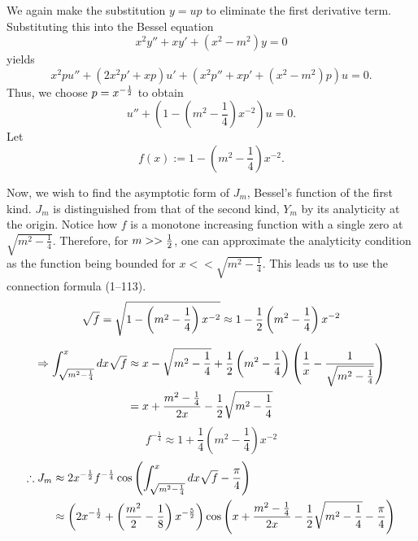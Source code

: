 \item
We again make the substitution $y = up$ to eliminate the first derivative term.
Substituting this into the Bessel equation
\[
	x^2 y'' + xy' + \left( x^2 - m^2 \right) y = 0
\]
yields
\[
	x^2 pu'' + \left( 2x^2 p' + xp \right)u' + \left( x^2 p'' + xp' + \left( x^2 - m^2 \right)p \right)u = 0.
\]	
Thus, we choose $p = x^{-\frac{1}{2}}$ to obtain
\[
	u'' + \left( 1 - \left( m^2 - \frac{1}{4} \right) x^{-2} \right) u = 0.
\]
Let
\[
	f(x) := 1 - \left( m^2 - \frac{1}{4} \right) x^{-2}.
\]

Now, we wish to find the asymptotic form of $J_m$, Bessel's function of the first kind.
$J_m$ is distinguished from that of the second kind, $Y_m$ by its analyticity at the origin.
Notice how $f$ is a monotone increasing function with a single zero at $\sqrt{m^2 - \frac{1}{4}}$.
Therefore, for $m >> \frac{1}{2}$, one can approximate the analyticity condition as the function being bounded for $x << \sqrt{m^2 - \frac{1}{4}}$.
This leads us to use the connection formula  (1--113).
\[
	\sqrt{f}
	= \sqrt{1 - \left( m^2 - \frac{1}{4} \right) x^{-2}}
	\approx 1 - \frac{1}{2} \left( m^2 - \frac{1}{4} \right) x^{-2}
\]
\begin{align*}
	\Rightarrow \int_{\sqrt{m^2 - \frac{1}{4}}}^{x} dx \sqrt{f}
	&\approx x - \sqrt{m^2 - \frac{1}{4}} + \frac{1}{2} \left( m^2 - \frac{1}{4} \right) \left( \frac{1}{x} - \frac{1}{\sqrt{m^2 - \frac{1}{4}}} \right) \\
	&= x + \frac{m^2 - \frac{1}{4}}{2x} - \frac{1}{2}\sqrt{m^2 - \frac{1}{4}}
\end{align*}
\[
	f^{-\frac{1}{4}} \approx 1 + \frac{1}{4} \left( m^2 - \frac{1}{4} \right) x^{-2}
\]
\begin{align*}
	\therefore J_m
	&\approx 2 x^{-\frac{1}{2}} f^{-\frac{1}{4}} \cos\left( \int_{\sqrt{m^2 - \frac{1}{4}}}^{x} dx \sqrt{f} - \frac{\pi}{4} \right) \\
	&\approx \left( 2x^{-\frac{1}{2}} + \left( \frac{m^2}{2} - \frac{1}{8} \right) x^{-\frac{5}{2}} \right)
	         \cos\left( x + \frac{m^2 - \frac{1}{4}}{2x} - \frac{1}{2}\sqrt{m^2 - \frac{1}{4}} - \frac{\pi}{4} \right)
\end{align*}
